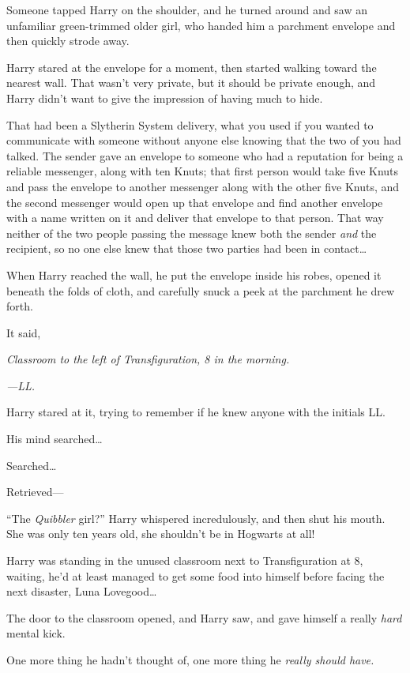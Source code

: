 Someone tapped Harry on the shoulder, and he turned around and saw an unfamiliar green-trimmed older girl, who handed him a parchment envelope and then quickly strode away.

Harry stared at the envelope for a moment, then started walking toward the nearest wall. That wasn’t very private, but it should be private enough, and Harry didn’t want to give the impression of having much to hide.

That had been a Slytherin System delivery, what you used if you wanted to communicate with someone without anyone else knowing that the two of you had talked. The sender gave an envelope to someone who had a reputation for being a reliable messenger, along with ten Knuts; that first person would take five Knuts and pass the envelope to another messenger along with the other five Knuts, and the second messenger would open up that envelope and find another envelope with a name written on it and deliver that envelope to that person. That way neither of the two people passing the message knew both the sender \emph{and} the recipient, so no one else knew that those two parties had been in contact…

When Harry reached the wall, he put the envelope inside his robes, opened it beneath the folds of cloth, and carefully snuck a peek at the parchment he drew forth.

It said,

\emph{Classroom to the left of Transfiguration, 8 in the morning.}

\emph{—LL.}

Harry stared at it, trying to remember if he knew anyone with the initials LL.

His mind searched…

Searched…

Retrieved—

“The \emph{Quibbler} girl?” Harry whispered incredulously, and then shut his mouth. She was only ten years old, she shouldn’t be in Hogwarts at all!


Harry was standing in the unused classroom next to Transfiguration at 8\AM, waiting, he’d at least managed to get some food into himself before facing the next disaster, Luna Lovegood…

The door to the classroom opened, and Harry saw, and gave himself a really \emph{hard} mental kick.

One more thing he hadn’t thought of, one more thing he \emph{really should have.}

